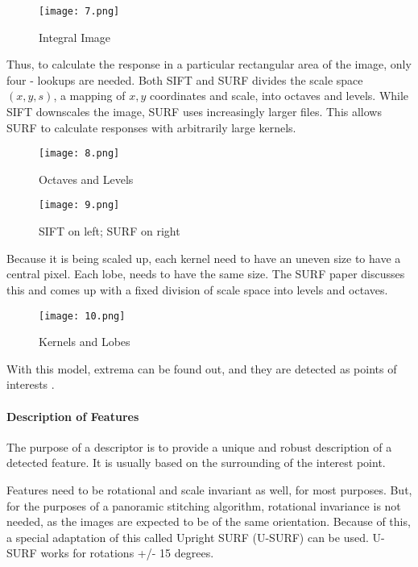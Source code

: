 \begin{figure}[htbp]
\sidecaption
\texttt{[image: 7.png]}
\caption{Integral Image}
\label{Fig_2_integral}       %
\end{figure}

Thus, to calculate the response in a particular rectangular area of the image, only four - lookups are needed. Both SIFT and SURF divides the scale space $(x, y, s)$, a mapping of $x, y$ coordinates and scale, into octaves and levels. While SIFT downscales the image, SURF uses increasingly larger files. This allows SURF to calculate responses with arbitrarily large kernels.

\begin{figure}[htbp]
\sidecaption
\texttt{[image: 8.png]}
\caption{Octaves and Levels}
\label{Fig_2_octaves}       %
\end{figure}

\begin{figure}[htbp]
\sidecaption
\texttt{[image: 9.png]}
\caption{SIFT on left; SURF on right}
\label{Fig_2_sift_surf}       %
\end{figure}

Because it is being scaled up, each kernel need to have an uneven size to have a central pixel. Each lobe, needs to have the same size. The SURF paper discusses this and comes up with a fixed division of scale space into levels and octaves.

\begin{figure}[htbp]
\sidecaption
\texttt{[image: 10.png]}
\caption{Kernels and Lobes}
\label{Fig_2_kernals}       %
\end{figure}

With this model, extrema can be found out, and they are detected as points of interests \cite{Pedersen2011}.

\paragraph*{\textbf{Description of Features}}

The purpose of a descriptor is to provide a unique and robust description of a detected feature. It is usually based on the surrounding of the interest point.

Features need to be rotational and scale invariant as well, for most purposes. But, for the purposes of a panoramic stitching algorithm, rotational invariance is not needed, as the images are expected to be of the same orientation. Because of this, a special adaptation of this called Upright SURF (U-SURF) can be used. U-SURF works for rotations +/- 15 degrees.

